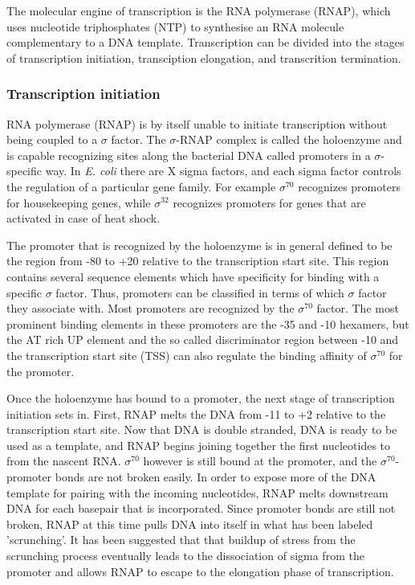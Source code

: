 %
%
The molecular engine of transcription is the RNA polymerase (RNAP), which uses
nucleotide triphosphates (NTP) to synthesise an RNA molecule complementary to a
DNA template. Transcription can be divided into the stages of transcription
initiation, transciption elongation, and transcrition termination. 

\subsubsection{Transcription initiation}
RNA polymerase (RNAP) is by itself unable to initiate transcription without
being coupled to a $\sigma$ factor. The $\sigma$-RNAP complex is called the
holoenzyme and is capable recognizing sites along the bacterial DNA called
promoters in a $\sigma$-specific way. In \textit{E. coli} there are X sigma
factors, and each sigma factor controls the regulation of a particular gene
family. For example $\sigma^{70}$ recognizes promoters for housekeeping genes,
while $\sigma^{32}$ recognizes promoters for genes that are activated in case
of heat shock.

The promoter that is recognized by the holoenzyme is in general defined to be
the region from -80 to +20 relative to the transcription start site. This
region contains several sequence elements which have specificity for binding
with a specific $\sigma$ factor. Thus, promoters can be classified in terms of
which $\sigma$ factor they associate with. Most promoters are recognized by the
$\sigma^{70}$ factor. The most prominent binding elements in these promoters
are the -35 and -10 hexamers, but the AT rich UP element and the so called
discriminator region between -10 and the transcription start site (TSS) can
also regulate the binding affinity of $\sigma^{70}$ for the promoter.

Once the holoenzyme has bound to a promoter, the next stage of transcription
initiation sets in. First, RNAP melts the DNA from -11 to +2 relative to the
transcription start site. Now that DNA is double stranded, DNA is ready to be
used as a template, and RNAP begins joining together the first nucleotides to
from the nascent RNA. $\sigma^{70}$ however is still bound at the promoter, and
the $\sigma^{70}$-promoter bonds are not broken easily. In order to expose more
of the DNA template for pairing with the incoming nucleotides, RNAP melts
downstream DNA for each basepair that is incorporated. Since promoter bonds are
still not broken, RNAP at this time pulls DNA into itself in what has been
labeled 'scrunching'. It has been suggested that that buildup of stress from
the scrunching process eventually leads to the dissociation of sigma from the
promoter and allows RNAP to escape to the elongation phase of transcription.

